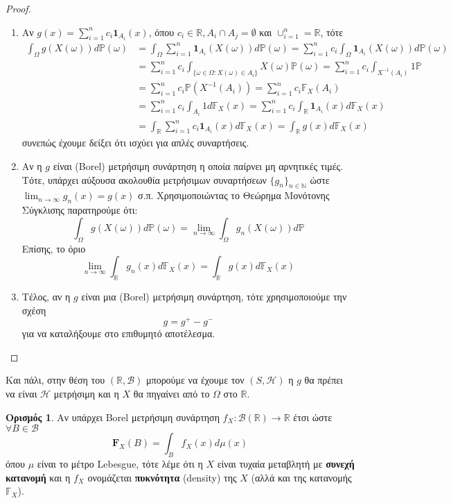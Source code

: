\documentclass[12pt,a4paper]{article}
\theoremstyle{definition}
\numberwithin{equation}{section}
\newtheorem{orismos}{Ορισμός}
\begin{document}
{\begin{proof}
\begin{enumerate}
\item Αν $g(x) = \sum_{i=1}^n c_i\mathbf{1}_{A_i}(x)$, όπου $c_i \in \mathbb{R}, A_i \cap A_j = \emptyset$ και $\cup_{i=1}^n = \mathbb{R}$, τότε
\begin{align*}
 \int_\Omega g(X(\omega)) d\mathbb{P}(\omega) &= \int_\Omega \sum_{i=1}^n \mathbf{1}_{A_i}(X(\omega))d\mathbb{P}(\omega) = \sum_{i=1}^nc_i\int_\Omega \mathbf{1}_{A_i}(X(\omega))d\mathbb{P}(\omega)\\
 &= \sum_{i=1}^nc_i\int_{\{ \omega\in\Omega : X(\omega) \in A_i\}} X(\omega) \mathbb{P}(\omega) = \sum_{i=1}^n c_i \int_{X^{-1}(A_i)} 1 \mathbb{P}\\
&= \sum_{i=1}^n c_i \mathbb{P}(X^{-1}(A_i)) = \sum_{i=1}^n c_i \mathbb{F}_X(A_i)\\
&= \sum_{i=1}^n c_i \int_{A_i} 1 d\mathbb{F}_X(x)= \sum_{i=1}^n c_i \int_{\mathbb{R}} \mathbf{1}_{A_i} (x)d\mathbb{F}_X(x)\\
&= \int_{\mathbb{R}} \sum_{i=1}^n c_i \mathbf{1}_{A_i} (x)d\mathbb{F}_X(x)= \int_{\mathbb{R}} g(x) d\mathbb{F}_X(x)
\end{align*}
συνεπώς έχουμε δείξει ότι ισχύει για απλές συναρτήσεις.
\item  Αν η $g$ είναι (Borel) μετρήσιμη συνάρτηση η οποία παίρνει μη αρνητικές τιμές. Τότε, υπάρχει αύξουσα ακολουθία μετρήσιμων συναρτήσεων $\{g_n\}_{n\in\mathbb{N}}$ ώστε $\lim_{n\rightarrow \infty} g_n(x) = g(x)$ σ.π.
Χρησιμοποιώντας το Θεώρημα Μονότονης Σύγκλισης παρατηρούμε ότι:
$$\int_\Omega g(X(\omega))d\mathbb{P}(\omega) = \lim_{n\rightarrow \infty} \int_\Omega g_n(X(\omega)) d\mathbb{P}$$
Επίσης, το όριο
$$ \lim_{n\rightarrow \infty} \int_\mathbb{R} g_n(x) d\mathbb{F}_X(x) = \int_\mathbb{R} g(x)d\mathbb{F}_X(x)$$
\item Τέλος, αν η $g$ είναι μια (Borel) μετρήσιμη συνάρτηση, τότε χρησιμοποιούμε την σχέση
$$g = g^+ - g^-$$
για να καταλήξουμε στο επιθυμητό αποτέλεσμα.
\end{enumerate}
\end{proof}

Και πάλι, στην θέση του \((\mathbb{R},\mathcal{B})\) μπορούμε να έχουμε τον \((S,\mathcal{H})\) η \(g\) θα πρέπει να είναι \(\mathcal{H}\) μετρήσιμη και η \(X\) θα πηγαίνει από το \(\Omega\) στο \(\mathbb{R}\).\\

\begin{orismos} Αν υπάρχει \textlatin{Borel} μετρήσιμη συνάρτηση $f_X:\mathcal{B}(\mathbb{R}) \rightarrow \mathbb{R}$ έτσι ώστε $\forall B \in \mathcal{B}$
$$\mathbf{F}_X(B) = \int_B f_X(x) d\mu(x)$$
όπου $\mu$ είναι το μέτρο \textlatin{Lebesgue}, τότε λέμε ότι η $X$ είναι τυχαία μεταβλητή με \textbf{συνεχή κατανομή} και η $f_X$ ονομάζεται \textbf{πυκνότητα} (density) της $X$ (αλλά και της κατανομής $\mathbb{F}_X$).
\end{orismos}

}
\end{document}
